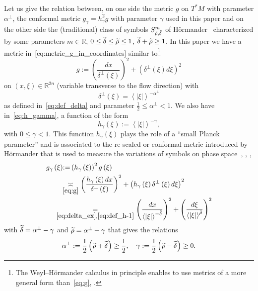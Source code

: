 \documentclass[AHL,Unicode,longabstracts,published]{cedram}
\newcommand{\bbR}{\mathbb{R}}
\let\oldtilde\tilde
\renewcommand*{\tilde}[1]{\mathchoice{\widetilde{#1}}{\widetilde{#1}}{\oldtilde{#1}}{\oldtilde{#1}}}
\newcommand{\bbR}{\mathbb{R}}
\begin{document}
Let us give the relation between, on one side the metric $g$ on $T^{*}M$ with parameter $\alpha^{\perp}$, the conformal metric $g_{\gamma}=h_{\gamma}^{2}g$ with parameter $\gamma$ used in this paper and on the other side the (traditional) class of symbols $S_{\tilde{\rho},\tilde{\delta}}^{m}$ of H\"ormander~\cite[Chap.~18]{hormander_3} characterized by some parameters $m\in\bbR$, $0\leq\tilde{\delta}\leq\tilde{\rho}\leq1$, $\tilde{\delta}+\tilde{\rho}\geq1$. In this paper we have a metric in~\eqref{eq:metric_g_in_coordinates} similar to\footnote{The Weyl--H\"ormander calculus in principle enables to use metrics of a more general form than~\eqref{eq:g}, \cite{hormander1979weyl}.}
\begin{equation}\label{eq:g}
g:=\left(\frac{dx}{\delta^{\perp}\left(\xi\right)}\right)^{2}+\left(\delta^{\perp}\left(\xi\right)d\xi\right)^{2}
\end{equation}
on $(x,\xi)\in\bbR^{2n}$ (variable transverse to the flow direction) with
\begin{equation}\label{eq:delta_ex}
\delta^{\perp}\left(\xi\right)=\left\langle \left|\xi\right|\right\rangle ^{-\alpha^{\perp}}
\end{equation}
as defined in~\eqref{eq:def_delta} and parameter $\frac{1}{2}\leq\alpha^{\perp}<1$. We also have in~\eqref{eq:h_gamma}, a function of the form
\begin{equation}\label{eq:def_h-1}
h_{\gamma}\left(\xi\right):=\left\langle \left|\xi\right|\right\rangle ^{-\gamma},
\end{equation}
with $0\leq\gamma<1$. This function $h_{\gamma}(\xi)$ plays the role of a ``small Planck parameter'' and is associated to the re-scaled or conformal metric introduced by H\"ormander that is used to measure the variations of symbols on phase space~\cite{hormander1979weyl}, \cite[Chap.18]{hormander_3}, \cite[p.~22, p.~68]{lerner2011metrics},  \cite{nicola_rodino_livre_11}
\begin{align*}
g_{\gamma}\left(\xi\right) & {:=}\left(h_{\gamma}\left(\xi\right)\right)^{2}g\left(\xi\right)\\
& \!\!\underset{\eqref{eq:g}}{\asymp}\left(\frac{h_{\gamma}\left(\xi\right)dx}{\delta^{\perp}\left(\xi\right)}\right)^{2}+\left(h_{\gamma}\left(\xi\right)\delta^{\perp}\left(\xi\right)d\xi\right)^{2}\\
& \mkern-22mu\underset{\eqref{eq:delta_ex},\eqref{eq:def_h-1}}{=}\left(\frac{dx}{\left\langle \left|\xi\right|\right\rangle ^{-\tilde{\delta}}}\right)^{2}+\left(\frac{d\xi}{\left\langle \left|\xi\right|\right\rangle ^{\tilde{\rho}}}\right)^{2}
\end{align*}
with $\tilde{\delta}=\alpha^{\perp}-\gamma$ and $\tilde{\rho}=\alpha^{\perp}+\gamma$ that gives the relations
\begin{equation}\label{eq:relations-1}
\alpha^{\perp}:=\frac{1}{2}\left(\tilde{\rho}+\tilde{\delta}\right)\geq\frac{1}{2},\quad\gamma:=\frac{1}{2}\left(\tilde{\rho}-\tilde{\delta}\right)\geq0.
\end{equation}
\end{document}

